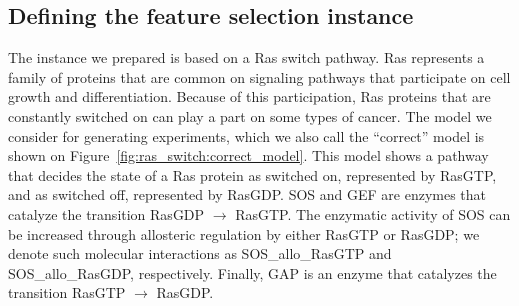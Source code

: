 \subsection{Defining the feature selection instance}


% 

The instance we prepared is based on a Ras switch pathway. Ras
represents a family of proteins that are common on signaling pathways
that participate on cell growth and differentiation. Because of this
participation, Ras proteins that are constantly switched on can play a 
part on some types of cancer. The model we consider for generating 
experiments, which we also call the ``correct'' model is shown on 
Figure~\ref{fig:ras_switch:correct_model}. This model shows a pathway
that decides the state of a Ras protein as switched on, represented by
RasGTP, and as switched off, represented by RasGDP. SOS and GEF are
enzymes that catalyze the transition RasGDP $\rightarrow$ RasGTP. The
enzymatic activity of SOS can be increased through allosteric regulation
by either RasGTP or RasGDP; we denote such molecular interactions as
SOS\_allo\_RasGTP and SOS\_allo\_RasGDP, respectively. Finally, GAP is
an enzyme that catalyzes the transition RasGTP $\rightarrow$ RasGDP.



